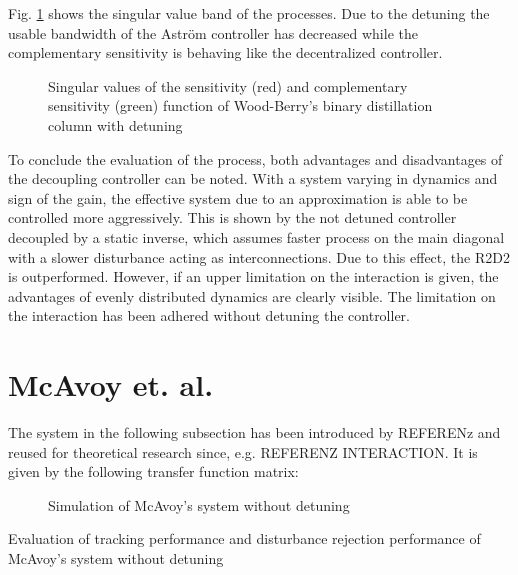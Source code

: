 Fig. \ref{c:fotd:s:woodberry:f:SingValDetuned} shows the singular value band of the processes.  Due to the detuning the usable bandwidth of the Astr\"om controller has decreased while the complementary sensitivity is behaving like the decentralized controller.\\

\begin{figure}[H]\centering

\caption{Singular values of the sensitivity (red) and complementary sensitivity (green) function of Wood-Berry's binary distillation column with detuning}
\label{c:fotd:s:woodberry:f:SingValDetuned}
\end{figure}

To conclude the evaluation of the process, both advantages and disadvantages of the decoupling controller can be noted. With a system varying in dynamics and sign of the gain, the effective system due to an approximation is able to be controlled more aggressively. This is shown by the not detuned controller decoupled by a static inverse, which assumes faster process on the main diagonal with a slower disturbance acting as interconnections. Due to this effect, the R2D2 is outperformed. However, if an upper limitation on the interaction is given, the advantages of evenly distributed dynamics are clearly visible. The limitation on the interaction has been adhered without detuning the controller.\\

\newpage

\section{McAvoy et. al.}%
\label{c:fotd:s:mcavoy}

The system in the following subsection has been introduced by REFERENz and reused for theoretical research since, e.g. REFERENZ INTERACTION. It is given by the following transfer function matrix:


\begin{figure}[H]\centering

\caption{Simulation of McAvoy's system without detuning}
\label{c:fotd:s:mcavoy:f:SimNotDetuned}
\end{figure}

\begin{table}[H]
\centering
\caption{Evaluation of tracking performance and disturbance rejection performance of McAvoy's system without detuning}
\label{c:fotd:s:mcavoy:tab:eval1}

\end{table}

